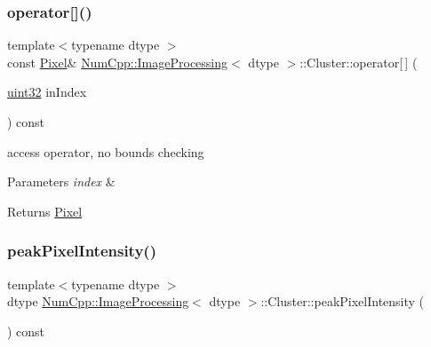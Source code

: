 \subsubsection{\texorpdfstring{operator[]()}{operator[]()}}
{\footnotesize\ttfamily template$<$typename dtype $>$ \\
const \mbox{\hyperlink{class_num_cpp_1_1_image_processing_1_1_pixel}{Pixel}}\& \mbox{\hyperlink{class_num_cpp_1_1_image_processing}{Num\+Cpp\+::\+Image\+Processing}}$<$ dtype $>$\+::Cluster\+::operator\mbox{[}$\,$\mbox{]} (\begin{DoxyParamCaption}\item[{\mbox{\hyperlink{namespace_num_cpp_a36f388e948380413c63011cab9b7fbd5}{uint32}}}]{in\+Index }\end{DoxyParamCaption}) const\hspace{0.3cm}{\ttfamily [inline]}}

access operator, no bounds checking


\begin{DoxyParams}{Parameters}
{\em index} & \\
\hline
\end{DoxyParams}
\begin{DoxyReturn}{Returns}
\mbox{\hyperlink{class_num_cpp_1_1_image_processing_1_1_pixel}{Pixel}} 
\end{DoxyReturn}
\mbox{\label{class_num_cpp_1_1_image_processing_1_1_cluster_a05910790dbdeebaa24f0a04d4ae5d176}} 
\subsubsection{\texorpdfstring{peak\+Pixel\+Intensity()}{peakPixelIntensity()}}
{\footnotesize\ttfamily template$<$typename dtype $>$ \\
dtype \mbox{\hyperlink{class_num_cpp_1_1_image_processing}{Num\+Cpp\+::\+Image\+Processing}}$<$ dtype $>$\+::Cluster\+::peak\+Pixel\+Intensity (\begin{DoxyParamCaption}{ }\end{DoxyParamCaption}) const\hspace{0.3cm}{\ttfamily [inline]}}

